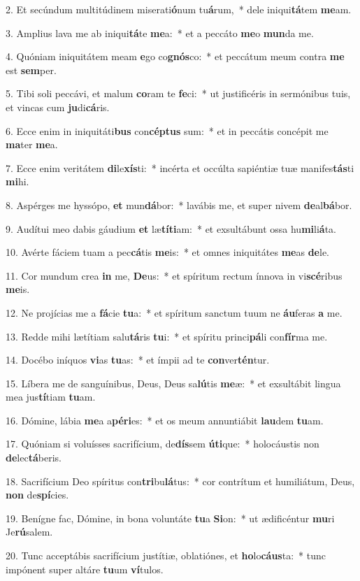 2. Et secúndum multitúdinem miserati\textbf{ó}num tu\textbf{á}rum,~*  dele iniqui\textbf{tá}tem \textbf{me}am.\

3. Amplius lava me ab iniqui\textbf{tá}te \textbf{me}a:~*  et a peccáto \textbf{me}o \textbf{mun}da me.\

4. Quóniam iniquitátem meam \textbf{e}go co\textbf{gnós}co:~*  et peccátum meum contra \textbf{me} est \textbf{sem}per.\

5. Tibi soli peccávi, et malum \textbf{co}ram te \textbf{fe}ci:~*  ut justificéris in sermónibus tuis, et vincas cum \textbf{ju}di\textbf{cá}ris.\

6. Ecce enim in iniquitáti\textbf{bus} con\textbf{cép}\textbf{tus} sum:~*  et in peccátis concépit me \textbf{ma}ter \textbf{me}a.\

7. Ecce enim veritátem \textbf{di}le\textbf{xís}ti:~*  incérta et occúlta sapiéntiæ tuæ manifes\textbf{tás}ti \textbf{mi}hi.\

8. Aspérges me hyssópo, \textbf{et} mun\textbf{dá}bor:~*  lavábis me, et super nivem \textbf{de}al\textbf{bá}bor.\

9. Audítui meo dabis gáudium \textbf{et} læ\textbf{tí}\textbf{ti}am:~*  et exsultábunt ossa hu\textbf{mi}li\textbf{á}ta.\

10. Avérte fáciem tuam a pec\textbf{cá}tis \textbf{me}is:~*  et omnes iniquitátes \textbf{me}as \textbf{de}le.\

11. Cor mundum crea \textbf{in} me, \textbf{De}us:~*  et spíritum rectum ínnova in vi\textbf{scé}ribus \textbf{me}is.\

12. Ne projícias me a \textbf{fá}cie \textbf{tu}a:~*  et spíritum sanctum tuum ne \textbf{áu}feras \textbf{a} me.\

13. Redde mihi lætítiam salu\textbf{tá}ris \textbf{tu}i:~*  et spíritu princi\textbf{pá}li con\textbf{fír}ma me.\

14. Docébo iníquos \textbf{vi}as \textbf{tu}as:~*  et ímpii ad te \textbf{con}ver\textbf{tén}tur.\

15. Líbera me de sanguínibus, Deus, Deus sa\textbf{lú}tis \textbf{me}æ:~*  et exsultábit lingua mea jus\textbf{tí}tiam \textbf{tu}am.\

16. Dómine, lábia \textbf{me}a a\textbf{pé}\textbf{ri}es:~*  et os meum annuntiábit \textbf{lau}dem \textbf{tu}am.\

17. Quóniam si voluísses sacrifícium, de\textbf{dís}sem \textbf{ú}\textbf{ti}que:~*  holocáustis non \textbf{de}lec\textbf{tá}beris.\

18. Sacrifícium Deo spíritus con\textbf{tri}bu\textbf{lá}tus:~*  cor contrítum et humiliátum, Deus, \textbf{non} de\textbf{spí}cies.\

19. Benígne fac, Dómine, in bona voluntáte \textbf{tu}a \textbf{Si}on:~*  ut ædificéntur \textbf{mu}ri Je\textbf{rú}salem.\

20. Tunc acceptábis sacrifícium justítiæ, oblatiónes, et \textbf{ho}lo\textbf{cáus}ta:~*  tunc impónent super altáre \textbf{tu}um \textbf{ví}tulos.\

